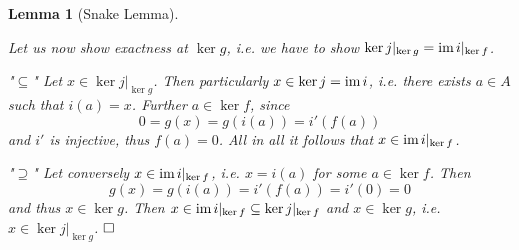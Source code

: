 \documentclass[11pt]{book}
\numberwithin{dummy}{section}
\newtheorem{lemma}[theorem]{Lemma}
\theoremstyle{nonumberbreak}
\newenvironment{pr}[1][]{\ifthenelse{\equal{#1}{}}{\proof}{\proof[#1]}\rm}{\endproof}
\newcommand{\im}{\mathrm{im} \hspace{1.5pt}}
\begin{document}
\begin{spacing}{1.4}
\begin{lemma}[Snake Lemma]
\begin{pr}
\begin{compactenum}
\item Let us now show exactness at $\ker g$, i.e. we have to show $\ker j \vert_{\ker g} = \im i\vert_{\ker f}$.
\begin{compactenum}
\item["$\subseteq$"] Let $x \in \ker j \vert_{\ker g}$. Then particularly $x \in \ker j = \im i$, i.e. there exists $a \in A$ such that $i(a) = x$. Further $a \in \ker f$, since
$$0=g(x) = g(i(a)) = i'(f(a))$$
and $i'$ is injective, thus $f(a) =0$. All in all it follows that $x \in \im i\vert_{\ker f}$.
\item["$\supseteq$"] Let conversely $x \in \im i \vert_{\ker f}$, i.e. $x=i(a)$ for some $a \in \ker f$. Then 
$$g(x) = g(i(a)) = i'(f(a)) = i'(0) = 0$$
and thus $x \in \ker g$. Then $x \in \im  i \vert_{\ker f} \subseteq \ker j \vert_{\ker f}$ and $x \in \ker g$, i.e. $x \in \ker j \vert_{\ker g}$. $\hfill \Box$
\end{compactenum}

\end{compactenum}


\end{pr}




\end{lemma}





\end{spacing}
\end{document}
